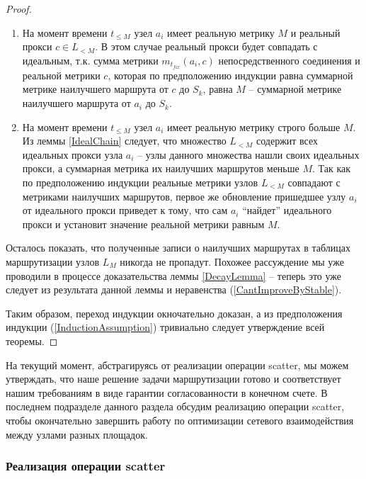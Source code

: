 \documentclass{article}
\theoremstyle{plain}
\theoremstyle{plain}
\theoremstyle{plain}
\theoremstyle{plain}
\theoremstyle{definition}
\theoremstyle{remark}
\theoremstyle{plain}
\begin{document}
\begin{proof}
    \begin{enumerate}
        \item На момент времени $t_{\leq M}$ узел $a_i$ имеет реальную метрику $M$ и реальный прокси $c \in L_{< M}$. В этом случае реальный прокси будет совпадать с идеальным, т.к. сумма метрики $m_{t_{fix}}(a_i, c)$ непосредственного соединения и реальной метрики $c$, которая по предположению индукции равна суммарной метрике наилучшего маршрута от $c$ до $S_k$, равна $M$ -- суммарной метрике наилучшего маршрута от $a_i$ до $S_k$.
        
        \item На момент времени $t_{\leq M}$ узел $a_i$ имеет реальную метрику строго больше $M$. Из леммы \ref{IdealChain} следует, что множество $L_{< M}$ содержит всех идеальных прокси узла $a_i$ -- узлы данного множества нашли своих идеальных прокси, а суммарная метрика их наилучших маршрутов меньше $M$. Так как по предположению индукции реальные метрики узлов $L_{< M}$ совпадают с метриками наилучших маршрутов, первое же обновление пришедшее узлу $a_i$ от идеального прокси приведет к тому, что сам $a_i$ \enquote{найдет} идеального прокси и установит значение реальной метрики равным $M$.
    \end{enumerate}
    
    Осталось показать, что полученные записи о наилучших маршрутах в таблицах маршрутизации узлов $L_M$ никогда не пропадут. Похожее рассуждение мы уже проводили в процессе доказательства леммы \ref{DecayLemma} -- теперь это уже следует из результата данной леммы и неравенства (\ref{CantImproveByStable}).
    
    Таким образом, переход индукции окночательно доказан, а из предположения индукции (\ref{InductionAssumption}) тривиально следует утверждение всей теоремы.
\end{proof}

На текущий момент, абстрагируясь от реализации операции scatter, мы можем утверждать, что наше решение задачи маршрутизации готово и соответствует нашим требованиям в виде гарантии согласованности в конечном счете. В последнем подразделе данного раздела обсудим реализацию операции scatter, чтобы окончательно завершить работу по оптимизации сетевого взаимодействия между узлами разных площадок.

\subsubsection{Реализация операции scatter}
\label{ScatterImplementation}
\end{document}
